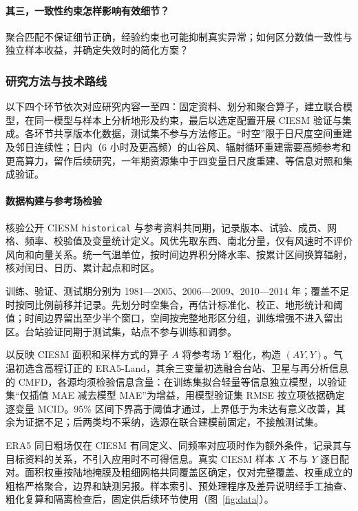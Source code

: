 \paragraph{其三，一致性约束怎样影响有效细节？}
聚合匹配不保证细节正确，经验约束也可能抑制真实异常；如何区分数值一致性与独立样本收益，并确定失效时的简化方案？

\subsubsection{研究方法与技术路线}

以下四个环节依次对应研究内容一至四：固定资料、划分和聚合算子，建立联合模型，在同一模型与样本上分析地形及约束，最后以选定配置开展 CIESM 验证与集成。各环节共享版本化数据，测试集不参与方法修正。“时空”限于日尺度空间重建及邻日连续性；日内（6 小时及更高频）的山谷风、辐射循环重建需要高频参考和更高算力，留作后续研究，一年期资源集中于四变量日尺度重建、等信息对照和集成验证。

\paragraph{数据构建与参考场检验}
核验公开 CIESM \texttt{historical} 与参考资料共同期，记录版本、试验、成员、网格、频率、校验值及变量统计定义。风优先取东西、南北分量，仅有风速时不评价风向和向量关系。统一气温单位，按时间边界积分降水率、按累计区间换算辐射，核对闰日、日历、累计起点和时区。

训练、验证、测试期分别为 1981—2005、2006—2009、2010—2014 年；覆盖不足时按同比例前移并记录。先划分时空集合，再估计标准化、校正、地形统计和阈值；时间边界留出至少半个窗口，空间按完整地形区分组，训练增强不进入留出区。台站验证同期于测试集，站点不参与训练和调参。

以反映 CIESM 面积和采样方式的算子 $A$ 将参考场 $Y$ 粗化，构造 $(AY,Y)$。气温初选含高程订正的 ERA5-Land，其余三变量初选融合台站、卫星与再分析信息的 CMFD\cite{He2020CMFD}，各源均须检验信息含量：在训练集拟合轻量等信息独立模型，以验证集“仅插值 MAE 减去模型 MAE”为增益，用模型验证集 RMSE 按立项依据确定逐变量 MCID。95\% 区间下界高于阈值才通过，上界低于为未达有意义改善，其余为证据不足；后两类均不采纳，选源在联合建模前固定，不接触测试集。

ERA5 同日粗场仅在 CIESM 有同定义、同频率对应项时作为额外条件，记录其与目标资料的关系，不引入应用时不可得信息。真实 CIESM 样本 $X$ 不与 $Y$ 逐日配对。面积权重按陆地掩膜及粗细网格共同覆盖区确定，仅对完整覆盖、权重成立的粗格严格聚合，边界和缺测另报。样本索引、预处理程序及差异说明经手工抽查、粗化复算和隔离检查后，固定供后续环节使用（图~\ref{fig:data}）。

